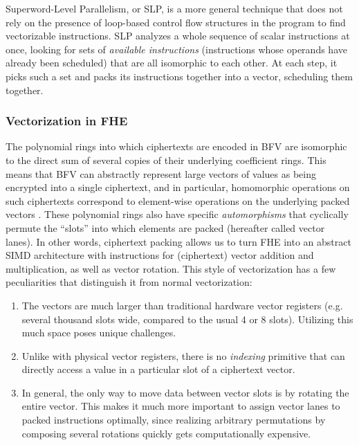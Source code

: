 Superword-Level Parallelism, or SLP, is a more general technique that does not rely on the presence of loop-based control flow structures in the program to find vectorizable instructions.
SLP analyzes a whole sequence of scalar instructions at once, looking for sets of {\em available instructions} (instructions whose operands have already been scheduled) that are all isomorphic to each other.
At each step, it picks such a set and packs its instructions together into a vector, scheduling them together.

\subsubsection*{Vectorization in FHE}
The polynomial rings into which ciphertexts are encoded in BFV are isomorphic to the direct sum of several copies of their underlying coefficient rings.
This means that BFV can abstractly represent large vectors of values as being encrypted into a single ciphertext, and in particular, homomorphic operations on such ciphertexts correspond to element-wise operations on the underlying packed vectors \cite{BrakerskiPacking}.
These polynomial rings also have specific {\em automorphisms} that cyclically permute the ``slots'' into which elements are packed (hereafter called vector lanes). 
In other words, ciphertext packing allows us to turn FHE into an abstract SIMD architecture with instructions for (ciphertext) vector addition and multiplication, as well as vector rotation.
This style of vectorization has a few peculiarities that distinguish it from normal vectorization:
\begin{enumerate}
    \item The vectors are much larger than traditional hardware vector registers (e.g. several thousand slots wide, compared to the usual 4 or 8 slots). Utilizing this much space poses unique challenges.
    \item Unlike with physical vector registers, there is no {\em indexing} primitive that can directly access a value in a particular slot of a ciphertext vector.
    \item In general, the only way to move data between vector slots is by rotating the entire vector. This makes it much more important to assign vector lanes to packed instructions optimally, since realizing arbitrary permutations by composing several rotations quickly gets computationally expensive. 
\end{enumerate}
